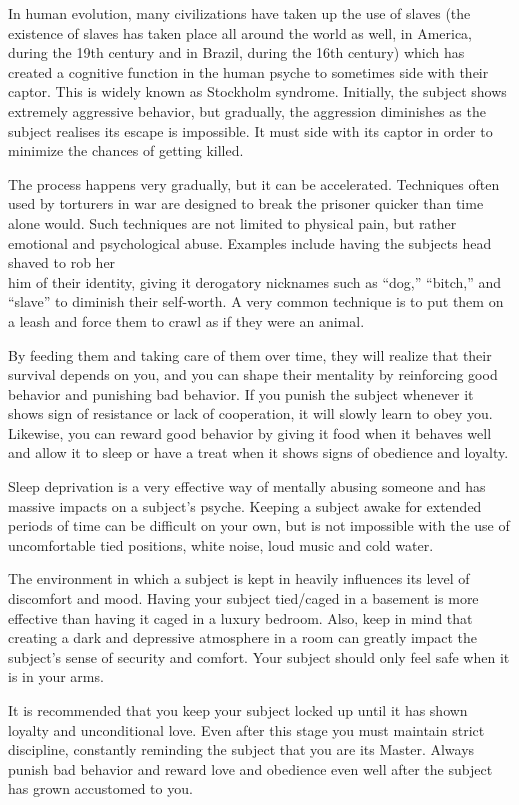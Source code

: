  



In human evolution, many civilizations have taken up the use of slaves (the 
existence of slaves has taken place all around the world as well, in America, 
during the 19th century and in Brazil, during the 16th century) which has 
created a cognitive function in the human psyche to sometimes side with their 
captor. This is widely known as Stockholm syndrome. Initially, the subject shows 
extremely aggressive behavior, but gradually, the aggression diminishes as the 
subject realises its escape is impossible. It must side with its captor in order 
to minimize the chances of getting killed.


The process happens very gradually, but it can be accelerated. Techniques often 
used by torturers in war are designed to break the prisoner quicker than time 
alone would. Such techniques are not limited to physical pain, but rather 
emotional and psychological abuse. Examples include having the subjects head 
shaved to rob her\\him of their identity, giving it derogatory nicknames such as 
“dog,” “bitch,” and “slave” to diminish their self-worth. A very common 
technique is to put them on a leash and force them to crawl as if they were an 
animal.


By feeding them and taking care of them over time, they will realize that their 
survival depends on you, and you can shape their mentality by reinforcing good 
behavior and punishing bad behavior. If you punish the subject whenever it shows 
sign of resistance or lack of cooperation, it will slowly learn to obey you. 
Likewise, you can reward good behavior by giving it food when it behaves well 
and allow it to sleep or have a treat when it shows signs of obedience and 
loyalty.


Sleep deprivation is a very effective way of mentally abusing someone and has 
massive impacts on a subject's psyche. Keeping a subject awake for extended 
periods of time can be difficult on your own, but is not impossible with the use 
of uncomfortable tied positions, white noise, loud music and cold water.


The environment in which a subject is kept in heavily influences its level of 
discomfort and mood. Having your subject tied/caged in a basement is more 
effective than having it caged in a luxury bedroom. Also, keep in mind that 
creating a dark and depressive atmosphere in a room can greatly impact the 
subject’s sense of security and comfort. Your subject should only feel safe when 
it is in your arms.


It is recommended that you keep your subject locked up until it has shown 
loyalty and unconditional love. Even after this stage you must maintain strict 
discipline, constantly reminding the subject that you are its Master. Always 
punish bad behavior and reward love and obedience even well after the subject 
has grown accustomed to you.
